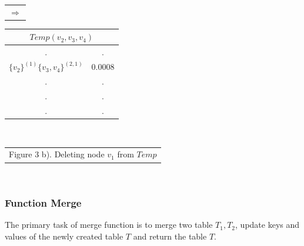 \documentclass[12pt]{article}
\begin{document}
\begin{table}[!htb]
\begin{minipage}{.06\linewidth}
        \begin{tabular}{c}
     $ \Rightarrow$\\
        \end{tabular}
    \end{minipage}%
    \begin{minipage}{.3\linewidth}
      \centering
     \begin{tabular}{cc}
\multicolumn{2}{c}{$Temp(v_2,v_3,v_4)$}                           \\ \hline
\multicolumn{1}{|c}{.} & \multicolumn{1}{|c|}{.} \\ \hline
  \multicolumn{1}{|l}{$\{v_2\}^{(1)}\{v_3,v_4\}^{(2,1)}$} & \multicolumn{1}{|l|}{$0.0008$} \\ \hline         
                   \multicolumn{1}{|c}{.} & \multicolumn{1}{|c|}{.} \\ \hline                 
                   \multicolumn{1}{|c}{.} & \multicolumn{1}{|c|}{.} \\ \hline
                   \multicolumn{1}{|c}{.} & \multicolumn{1}{|c|}{.} \\ \hline        
\end{tabular}
    \end{minipage}\\
      \begin{minipage}{1.0\linewidth}
       \centering

        \begin{tabular}{c}
Figure 3 b). Deleting node $v_1$ from $Temp$
        \end{tabular}
    \end{minipage}\\
\end{table}
\subsubsection{Function Merge}
\label{subsub:Mrg}
The primary task of merge function is to merge two table $T_1, T_2$, update keys and values of the newly created table $T$ and return the table $T$.
\end{document}

